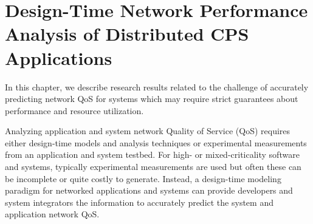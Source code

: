 \chapter{Design-Time Network Performance Analysis of Distributed CPS Applications}
\label{ch:designTime}

In this chapter, we describe research results related to the
challenge of accurately predicting network QoS for systems which may
require strict guarantees about performance and resource utilization.

Analyzing application and system network Quality of Service (QoS)
requires either design-time models and analysis techniques or
experimental measurements from an application and system testbed.  For
high- or mixed-criticality software and systems, typically
experimental measurements are used but often these can be incomplete
or quite costly to generate.  Instead, a design-time modeling paradigm
for networked applications and systems can provide developers and
system integrators the information to accurately predict the system
and application network QoS.

